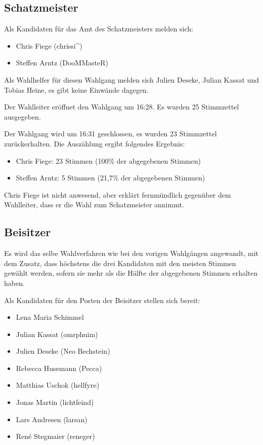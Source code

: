 \documentclass[a4paper,12pt]{scrartcl}
\begin{document}
\subsection{Schatzmeister}
Als Kandidaten für das Amt des Schatzmeisters melden sich:
\begin{itemize}
  \item Chris Fiege (chrissi\textasciicircum)
  \item Steffen Arntz (DooMMasteR)
\end{itemize}

Als Wahlhelfer für diesen Wahlgang melden sich Julien Deseke, Julian Kassat und
Tobias Heine, es gibt keine Einwände dagegen.

Der Wahlleiter eröffnet den Wahlgang um 16:28. Es wurden 25 Stimmzettel
ausgegeben.

Der Wahlgang wird um 16:31 geschlossen, es wurden 23 Stimmzettel zurückerhalten.
Die Auszählung ergibt folgendes Ergebnis:

\begin{itemize}
  \item Chris Fiege: 23 Stimmen (100\% der abgegebenen Stimmen)
  \item Steffen Arntz: 5 Stimmen (21{,}7\% der abgegebenen Stimmen)
\end{itemize}

Chris Fiege ist nicht anwesend, aber erklärt fernmündlich gegenüber dem
Wahlleiter, dass er die Wahl zum Schatzmeister annimmt.

\subsection{Beisitzer}
Es wird das selbe Wahlverfahren wie bei den vorigen Wahlgängen angewandt, mit
dem Zusatz, dass höchstens die drei Kandidaten mit den meisten Stimmen gewählt
werden, sofern sie mehr als die Hälfte der abgegebenen Stimmen erhalten haben.

Als Kandidaten für den Posten der Beisitzer stellen sich bereit:
\begin{itemize}
  \item Lena Maria Schimmel
  \item Julian Kassat (omrphuim)
  \item Julien Deseke (Neo Bechstein)
  \item Rebecca Husemann (Pecca)
  \item Matthias Uschok (hellfyre)
  \item Jonas Martin (lichtfeind)
  \item Lars Andresen (larsan)
  \item René Stegmaier (reneger)
\end{itemize}
\end{document}
